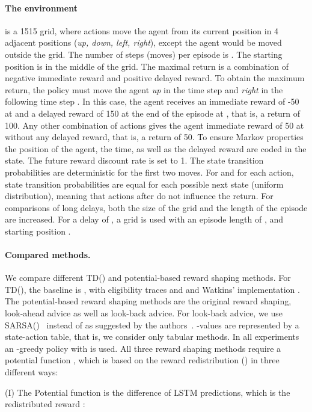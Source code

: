 \documentclass{article}
\begin{document}
\begin{appendices}
\paragraph{ The environment } is a 1515 grid, where 
actions move the agent from its current position 
in 4 adjacent positions ({\em up, down, left, right}), 
except the agent would be moved outside the grid. 
The number of steps (moves) per episode is . 
The starting position is  in the middle of the grid. 
The maximal return is a combination of negative immediate reward 
and positive delayed reward.
To obtain the maximum return, 
the policy must move the agent {\em up} in the time step  and  
{\em right} in the following time step . In this case, the 
agent receives an immediate reward of -50 at  and 
a delayed reward of 150 at the end of the episode at , 
that is, a return of 100.
Any other combination of actions gives the agent immediate reward of 50 at  without
any delayed reward, that is, a return of 50.
To ensure Markov properties the position of the agent, the time, as well as the delayed reward
are coded in the state. The future reward discount rate  is set to 1.
The state transition probabilities are deterministic for the first two moves.
For  and for each action, state transition probabilities 
are equal for each possible next state (uniform distribution), 
meaning that 
actions after  do not influence the return.
For comparisons of long delays, 
both the size of the grid and the length of the episode are increased. 
For a delay of , a  grid is used
with an episode length of , 
and starting position .

\paragraph{Compared methods.}
We compare different TD() and potential-based reward shaping methods.
For TD(), the baseline is , 
with eligibility traces  and  and Watkins' implementation \cite{Watkins:89}. 
The potential-based reward shaping methods are the original reward shaping, 
look-ahead advice as well as look-back advice. 
For look-back advice, we use SARSA()~\cite{Rummery:94} instead of  
as suggested by the authors~\cite{Wiewiora:03}. 
-values are represented by a state-action table, that is, we consider only
tabular methods.
In all experiments an -greedy policy with  is used.
All three reward shaping methods 
require a potential function ,
which is based on the reward redistribution () 
in three different ways:


(I) The Potential function  is the difference of LSTM predictions, 
which is the redistributed reward :


\end{appendices}
\end{document}
